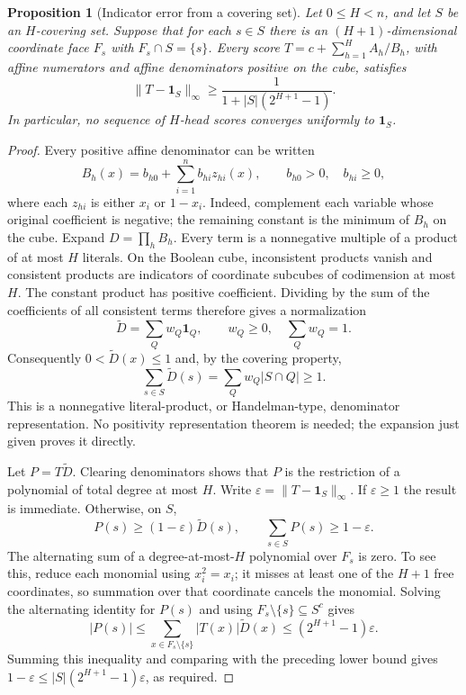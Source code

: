 \documentclass[11pt]{article}
\newtheorem{proposition}{Proposition}
\begin{document}
\begin{proposition}[Indicator error from a covering set]
Let $0\le H<n$, and let $S$ be an $H$-covering set. Suppose that
for each $s\in S$ there is an $(H+1)$-dimensional coordinate face
$F_s$ with $F_s\cap S=\{s\}$. Every score
$T=c+\sum_{h=1}^H A_h/B_h$, with affine numerators and affine
denominators positive on the cube, satisfies
\[
 \|T-\mathbf1_S\|_\infty
 \ge\frac1{1+|S|(2^{H+1}-1)}.
\]
In particular, no sequence of $H$-head scores converges uniformly
to $\mathbf1_S$.
\end{proposition}
\begin{proof}
Every positive affine denominator can be written
\[
 B_h(x)=b_{h0}+\sum_{i=1}^n b_{hi}z_{hi}(x),
 \qquad b_{h0}>0,\quad b_{hi}\ge0,
\]
where each $z_{hi}$ is either $x_i$ or $1-x_i$. Indeed, complement
each variable whose original coefficient is negative; the remaining
constant is the minimum of $B_h$ on the cube. Expand
$D=\prod_hB_h$. Every term is a nonnegative multiple of a product
of at most $H$ literals. On the Boolean cube, inconsistent products
vanish and consistent products are indicators of coordinate
subcubes of codimension at most $H$. The constant product has
positive coefficient. Dividing by the sum of the coefficients of
all consistent terms therefore gives a normalization
\[
 \widetilde D=\sum_Q w_Q\mathbf1_Q,
 \qquad w_Q\ge0,\quad\sum_Qw_Q=1.
\]
Consequently $0<\widetilde D(x)\le1$ and, by the covering property,
\[
 \sum_{s\in S}\widetilde D(s)
 =\sum_Qw_Q|S\cap Q|\ge1.
\]
This is a nonnegative literal-product, or Handelman-type,
denominator representation. No positivity representation theorem
is needed; the expansion just given proves it directly.

Let $P=T\widetilde D$. Clearing denominators shows that $P$ is
the restriction of a polynomial of total degree at most $H$.
Write $\varepsilon=\|T-\mathbf1_S\|_\infty$. If
$\varepsilon\ge1$ the result is immediate. Otherwise, on $S$,
\[
 P(s)\ge(1-\varepsilon)\widetilde D(s),
 \qquad \sum_{s\in S}P(s)\ge1-\varepsilon.
\]
The alternating sum of a degree-at-most-$H$ polynomial over
$F_s$ is zero. To see this, reduce each monomial using $x_i^2=x_i$;
it misses at least one of the $H+1$ free coordinates, so summation
over that coordinate cancels the monomial. Solving the alternating
identity for $P(s)$ and using $F_s\setminus\{s\}\subseteq S^c$ gives
\[
 |P(s)|\le\sum_{x\in F_s\setminus\{s\}}|T(x)|\widetilde D(x)
 \le(2^{H+1}-1)\varepsilon.
\]
Summing this inequality and comparing with the preceding lower bound
gives $1-\varepsilon\le|S|(2^{H+1}-1)\varepsilon$, as required.
\end{proof}
\end{document}

